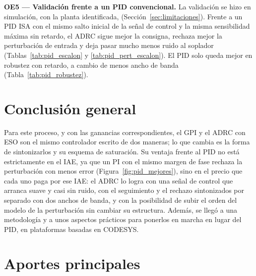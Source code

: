 \textbf{OE5 --- Validación frente a un PID convencional.} La validación se hizo en simulación, con la
planta identificada, (Sección~\ref{sec:limitaciones}). Frente a un PID ISA con el mismo
salto inicial de la señal de control y la misma sensibilidad máxima sin retardo, el ADRC sigue mejor la
consigna, rechaza mejor la perturbación de entrada y deja pasar mucho menos ruido al soplador
(Tablas~\ref{tab:pid_escalon} y \ref{tab:pid_pert_escalon}). El PID solo queda mejor en robustez con retardo, a cambio de menos
ancho de banda (Tabla~\ref{tab:pid_robustez}).

\section{Conclusión general}

Para este proceso, y con las ganancias correspondientes, el GPI y el ADRC con ESO son el mismo
controlador escrito de dos maneras; lo que cambia es la forma de sintonizarlos y su esquema de
saturación. Su ventaja frente al PID no está estrictamente en el IAE, ya que un PI con el mismo margen
de fase rechaza la perturbación con menos error (Figura~\ref{fig:pid_mejores}), sino en el precio que
cada uno paga por ese IAE: el ADRC lo logra con una señal de control que arranca suave y casi sin ruido,
con el seguimiento y el rechazo sintonizados por separado con dos anchos de banda, y con la posibilidad
de subir el orden del modelo de la perturbación sin cambiar su estructura. Además, se llegó a una
metodología y a unos aspectos prácticos para ponerlos en marcha en lugar del PID, en plataformas basadas
en CODESYS.

\section{Aportes principales}

